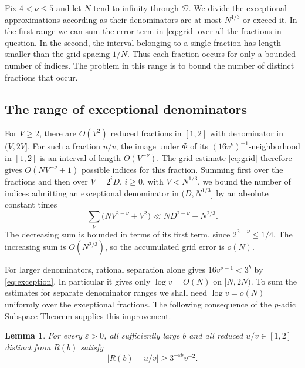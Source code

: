 \documentclass[11pt,reqno]{amsart}
\newtheorem{lemma}{Lemma}[section]
\theoremstyle{definition}
\newcommand{\DD}{\mathcal D}
\begin{document}
Fix $4<\nu\le5$ and let $N$ tend to infinity through $\DD$.
We divide the exceptional approximations according as their
denominators are at most $N^{1/3}$ or exceed it. In the first range
we can sum the error term in \eqref{eq:grid} over all the fractions
in question. In the second, the interval belonging to a single
fraction has length smaller than the grid spacing $1/N$. Thus each
fraction occurs for only a bounded number of indices. The problem
in this range is to bound the number of distinct fractions that occur.

\subsection{The range of exceptional denominators}

For $V\ge2$, there are $O(V^2)$ reduced fractions in $[1,2]$ with
denominator in $(V,2V]$. For such a fraction $u/v$, the image under
$\Phi$ of its $(16v^\nu)^{-1}$-neighborhood in $[1,2]$ is an
interval of length $O(V^{-\nu})$. The grid estimate \eqref{eq:grid}
therefore gives $O(NV^{-\nu}+1)$ possible indices for this fraction.
Summing first over the fractions and then over $V=2^iD$, $i\ge0$,
with $V<N^{1/3}$, we bound the number of indices admitting an
exceptional denominator in $(D,N^{1/3}]$ by an absolute constant times
\begin{equation}\label{eq:small}
 \sum_{V}\bigl(NV^{2-\nu}+V^2\bigr)
 \ll ND^{2-\nu}+N^{2/3}.
\end{equation}
The decreasing sum is bounded in terms of its first term, since
$2^{2-\nu}\le1/4$. The increasing sum is $O(N^{2/3})$, so the accumulated grid error
is $o(N)$.

For larger denominators, rational separation alone gives
$16v^{\nu-1}<3^b$ by \eqref{eq:exception}. In particular it gives
only $\log v=O(N)$ on $[N,2N)$. To sum the estimates for separate
denominator ranges we shall need $\log v=o(N)$ uniformly over the
exceptional fractions. The following consequence of the $p$-adic
Subspace Theorem supplies this improvement.

\begin{lemma}\label{lem:height}
For every $\varepsilon>0$, all sufficiently large $b$ and
all reduced $u/v\in[1,2]$ distinct from $R(b)$ satisfy
\[
 |R(b)-u/v|\ge 3^{-\varepsilon b}v^{-2}.
\]
\end{lemma}
\end{document}
